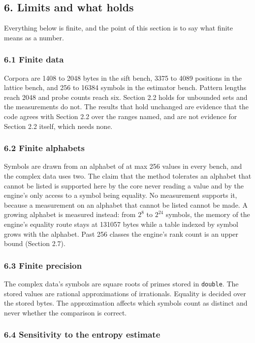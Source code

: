 \subsection{6. Limits and what holds}

Everything below is finite, and the point of this section is to say what finite means as a number.

\subsubsection{6.1 Finite data}

Corpora are 1408 to 2048 bytes in the sift bench, 3375 to 4089 positions in the lattice bench, and 256 to 16384 symbols in the estimator bench. Pattern lengths reach 2048 and probe counts reach six. Section 2.2 holds for unbounded sets and the measurements do not. The results that hold unchanged are evidence that the code agrees with Section 2.2 over the ranges named, and are not evidence for Section 2.2 itself, which needs none.

\subsubsection{6.2 Finite alphabets}

Symbols are drawn from an alphabet of at max 256 values in every bench, and the complex data uses two. The claim that the method tolerates an alphabet that cannot be listed is supported here by the core never reading a value and by the engine's only access to a symbol being equality. No measurement supports it, because a measurement on an alphabet that cannot be listed cannot be made. A growing alphabet is measured instead: from \(2^8\) to \(2^{24}\) symbols, the memory of the engine's equality route stays at 131057 bytes while a table indexed by symbol grows with the alphabet. Past 256 classes the engine's rank count is an upper bound (Section 2.7).

\subsubsection{6.3 Finite precision}

The complex data's symbols are square roots of primes stored in \texttt{double}. The stored values are rational approximations of irrationals. Equality is decided over the stored bytes. The approximation affects which symbols count as distinct and never whether the comparison is correct.

\subsubsection{6.4 Sensitivity to the entropy estimate}

